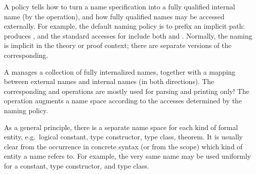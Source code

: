 \begin{isabellebody}
\begin{isamarkuptext}
  \medskip A  policy tells how to turn a name
  specification into a fully qualified internal name (by the  operation), and how fully qualified names may be accessed
  externally.  For example, the default naming policy is to prefix an
  implicit path:  produces , and the
  standard accesses for  include both  and
  .  Normally, the naming is implicit in the theory or
  proof context; there are separate versions of the corresponding.

  \medskip A  manages a collection of fully
  internalized names, together with a mapping between external names
  and internal names (in both directions).  The corresponding  and  operations are mostly used for
  parsing and printing only!  The  operation augments
  a name space according to the accesses determined by the naming
  policy.

  \medskip As a general principle, there is a separate name space for
  each kind of formal entity, e.g.\ logical constant, type
  constructor, type class, theorem.  It is usually clear from the
  occurrence in concrete syntax (or from the scope) which kind of
  entity a name refers to.  For example, the very same name  may be used uniformly for a constant, type constructor, and
  type class.


\end{isamarkuptext}
\end{isabellebody}

